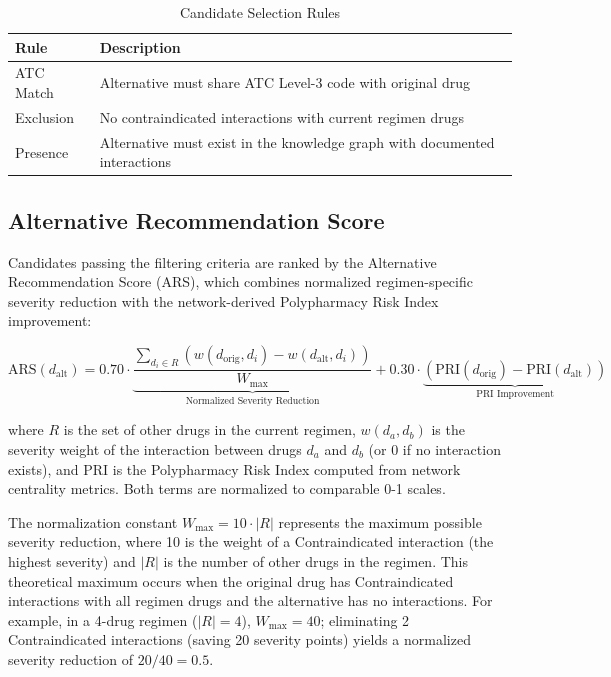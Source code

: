\documentclass[11pt,a4paper]{article}
\begin{document}
\begin{table}[H]
\centering
\caption{Candidate Selection Rules}
\label{tab:candidate_rules}
\begin{tabular}{lp{10cm}}
\toprule
\textbf{Rule} & \textbf{Description} \\
\midrule
ATC Match & Alternative must share ATC Level-3 code with original drug \\
Exclusion & No contraindicated interactions with current regimen drugs \\
Presence & Alternative must exist in the knowledge graph with documented interactions \\
\bottomrule
\end{tabular}
\end{table}

\subsection{Alternative Recommendation Score}

Candidates passing the filtering criteria are ranked by the Alternative Recommendation Score (ARS), which combines normalized regimen-specific severity reduction with the network-derived Polypharmacy Risk Index improvement:

\begin{equation}
\text{ARS}(d_{\text{alt}}) = 0.70 \cdot \underbrace{\frac{\sum_{d_i \in R} \left( w(d_{\text{orig}}, d_i) - w(d_{\text{alt}}, d_i) \right)}{W_{\text{max}}}}_{\text{Normalized Severity Reduction}} + 0.30 \cdot \underbrace{\left( \text{PRI}(d_{\text{orig}}) - \text{PRI}(d_{\text{alt}}) \right)}_{\text{PRI Improvement}}
\label{eq:ars}
\end{equation}

where $R$ is the set of other drugs in the current regimen, $w(d_a, d_b)$ is the severity weight of the interaction between drugs $d_a$ and $d_b$ (or 0 if no interaction exists), and PRI is the Polypharmacy Risk Index computed from network centrality metrics. Both terms are normalized to comparable 0-1 scales.

The normalization constant $W_{\text{max}} = 10 \cdot |R|$ represents the maximum possible severity reduction, where 10 is the weight of a Contraindicated interaction (the highest severity) and $|R|$ is the number of other drugs in the regimen. This theoretical maximum occurs when the original drug has Contraindicated interactions with all regimen drugs and the alternative has no interactions. For example, in a 4-drug regimen ($|R| = 4$), $W_{\text{max}} = 40$; eliminating 2 Contraindicated interactions (saving 20 severity points) yields a normalized severity reduction of $20/40 = 0.5$.
\end{document}
